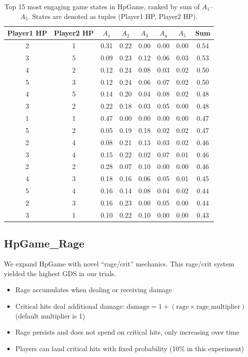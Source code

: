 \documentclass[manuscript,review,anonymous]{acmart}
\theoremstyle{definition}
\theoremstyle{plain}
\begin{document}
\begin{table}
  \caption{Top 15 most engaging game states in HpGame, ranked by sum of $A_1$--$A_5$. States are denoted as tuples (Player1 HP, Player2 HP).}
  \label{tab:most_engaging_states}
  \setlength{\tabcolsep}{4pt}
  \begin{tabular}{cccccccc}
    \toprule
    Player1 HP & Player2 HP & $A_1$ & $A_2$ & $A_3$ & $A_4$ & $A_5$ & Sum \\
    \midrule
    2 & 1 & 0.31 & 0.22 & 0.00 & 0.00 & 0.00 & 0.54 \\
    3 & 5 & 0.09 & 0.23 & 0.12 & 0.06 & 0.03 & 0.53 \\
    4 & 2 & 0.12 & 0.24 & 0.08 & 0.03 & 0.02 & 0.50 \\
    5 & 3 & 0.12 & 0.24 & 0.06 & 0.07 & 0.02 & 0.50 \\
    4 & 5 & 0.14 & 0.20 & 0.04 & 0.08 & 0.02 & 0.48 \\
    3 & 2 & 0.22 & 0.18 & 0.03 & 0.05 & 0.00 & 0.48 \\
    1 & 1 & 0.47 & 0.00 & 0.00 & 0.00 & 0.00 & 0.47 \\
    5 & 2 & 0.05 & 0.19 & 0.18 & 0.02 & 0.02 & 0.47 \\
    2 & 4 & 0.08 & 0.21 & 0.13 & 0.03 & 0.02 & 0.46 \\
    3 & 4 & 0.15 & 0.22 & 0.02 & 0.07 & 0.01 & 0.46 \\
    2 & 2 & 0.28 & 0.07 & 0.10 & 0.00 & 0.00 & 0.46 \\
    4 & 3 & 0.18 & 0.16 & 0.06 & 0.05 & 0.01 & 0.45 \\
    5 & 4 & 0.16 & 0.14 & 0.08 & 0.04 & 0.02 & 0.44 \\
    2 & 3 & 0.16 & 0.23 & 0.00 & 0.05 & 0.00 & 0.44 \\
    3 & 1 & 0.10 & 0.22 & 0.10 & 0.00 & 0.00 & 0.43 \\
    \bottomrule
  \end{tabular}
\end{table}

\subsection{HpGame\_Rage}
We expand HpGame with novel ``rage/crit'' mechanics.
This rage/crit system yielded the highest GDS in our trials.

\begin{itemize}
  \item Rage accumulates when dealing or receiving damage
  \item Critical hits deal additional damage: $\text{damage} = 1 + (\text{rage} \times \text{rage\_multiplier})$ (default multiplier is 1)
  \item Rage persists and does not spend on critical hits, only increasing over time
  \item Players can land critical hits with fixed probability (10\% in this experiment)
\end{itemize}
\end{document}
